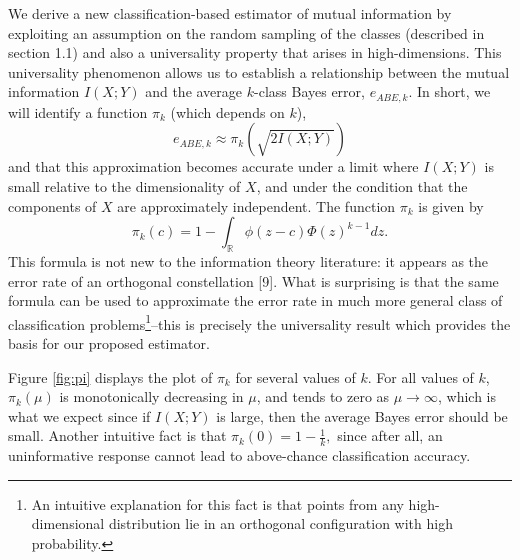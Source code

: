 \documentclass{article}
\begin{document}
We derive a new classification-based estimator of mutual information by exploiting an assumption on the
random sampling of the classes (described in section 1.1) and also
a universality property that arises in
high-dimensions.  This universality phenomenon allows us to establish
a relationship between the mutual information $I(X; Y)$ and the
average $k$-class Bayes error, $e_{ABE, k}$.  In short, we will
identify a function $\pi_k$ (which depends on $k$),
\begin{equation}\label{abepi}
e_{ABE, k} \approx \pi_k(\sqrt{2 I(X; Y)})
\end{equation}
and that this approximation becomes accurate under a limit where $I(X;
Y)$ is small relative to the dimensionality of $X$, and under the
condition that the components of $X$ are approximately independent.
The function $\pi_k$ is given by
\[
\pi_k(c) = 1 - \int_{\mathbb{R}} \phi(z - c)  \Phi(z)^{k-1} dz.
\]
This formula is not new to the information theory literature: it
appears as the error rate of an orthogonal constellation [9].  What
is surprising is that the same formula can be used to approximate the
error rate in much more general class of classification
problems\footnote{An intuitive explanation for this fact is that
  points from any high-dimensional distribution lie in an orthogonal
  configuration with high probability.}--this is precisely the
universality result which provides the basis for our proposed
estimator.

Figure \ref{fig:pi} displays the plot of $\pi_k$ for several values of
$k$.  For all values of $k$, $\pi_k(\mu)$ is monotonically decreasing
in $\mu$, and tends to zero as $\mu \to \infty$, which is what we
expect since if $I(X; Y)$ is large, then the average Bayes error
should be small.  Another intuitive fact is that $ \pi_k(0) = 1 -
\frac{1}{k}, $ since after all, an uninformative response cannot lead
to above-chance classification accuracy.
\end{document}
